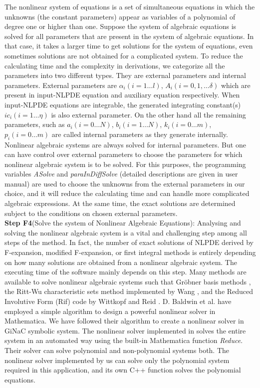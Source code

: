 \documentclass[prd,aps,floats,showkeys,nofootinbib,notitlepage]{revtex4}
\begin{document}
	The nonlinear system of equations is a set of simultaneous equations in which the unknowns (the constant parameters) appear as variables of a polynomial of degree one or higher than one.
	Suppose the system of algebraic equations is solved for all parameters that are present in the system of algebraic equations. In that case, it takes a larger time to get solutions for the system of equations, even sometimes solutions are not obtained for a complicated system. To reduce the calculating time and the complexity in derivations, we categorize all the parameters into two different types. They are external parameters and internal parameters. External parameters are $\alpha_i(i=1\ldots l)$, $A_i(i=0,1,\ldots \delta)$ which are present in input-NLPDE equation and auxiliary equation respectively. When input-NLPDE equations are integrable, the generated integrating constant(s) $ic_i(i=1\ldots \eta)$ is also external parameter. On the other hand all the remaining parameters, such as $a_i(i=0\ldots N)$, $b_i(i=1\ldots N)$, $k_i(i=0\ldots m)$, $p_i(i=0\ldots m)$ are called internal parameters as they generate internally. Nonlinear algebraic systems are always solved for internal parameters. But one can have control over external parameters to choose the parameters for which nonlinear algebraic system is to be solved. For this purposes, the programming variables {\em ASolve} and {\em paraInDiffSolve} (detailed descriptions are given in user manual) are used to choose the unknowns from the external parameters in our choice, and it will reduce the calculating time and can handle more complicated algebraic expressions. At the same time, the exact solutions are determined subject to the conditions on chosen external parameters.    \\
	
	\textbf{Step F4}(Solve the system of Nonlinear Algebraic Equations): Analysing and solving the nonlinear algebraic system is a vital and challenging step among all steps of the method. In fact, the number of exact solutions of NLPDE derived by F-expansion, modified F-expansion, or first integral methods is entirely depending on how many solutions are obtained from a nonlinear algebraic system. The executing time of the software mainly depends on this step. Many methods are available to solve nonlinear algebraic systems such that Gröbner basis methods \cite{grobner}, the Ritt-Wu characteristic sets method implemented by Wang \cite{RittWu,RittWu1}, and the Reduced Involutive Form (Rif) code by Wittkopf and Reid \cite{rif}. D. Baldwin et al. \cite{baldwin} have employed a simple algorithm to design a powerful nonlinear solver in Mathematica. We have followed their algorithm to create a nonlinear solver in GiNaC symbolic system. The nonlinear solver implemented in \cite{baldwin} solves the entire system in an automated way using the built-in Mathematica function \textit{Reduce}. Their solver can solve polynomial and non-polynomial systems both. The nonlinear solver implemented by us can solve only the polynomial system required in this application, and its own C++ function solves the polynomial equations.  
	
\end{document}
